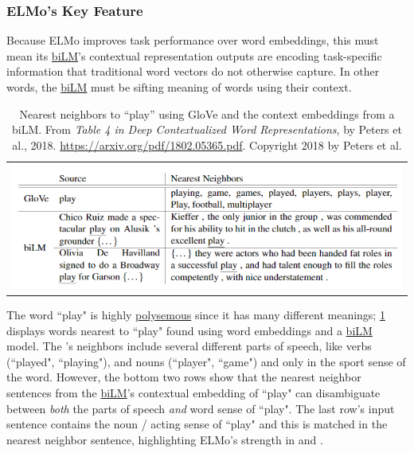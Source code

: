 \subsubsection{ELMo's Key Feature} \label{sec:ELMoKeyFeature}

Because ELMo improves task performance over word embeddings, this must mean its \hyperref[sec:BidirectionalLM]{biLM}'s contextual representation outputs are encoding task-specific information that traditional word vectors do not otherwise capture. In other words, the \hyperref[sec:BidirectionalLM]{biLM} must be sifting meaning of words using their context.   


\begin{table}[ht!]
  \centering
  \begin{tabular}{ c }
    
    \begin{minipage}{.8\textwidth}
      \includegraphics[width=\linewidth]{imgs/table_elmoPlay.png}
    \end{minipage}
    
  \end{tabular}
  \caption{\footnotesize Nearest neighbors to ``play” using GloVe and the context embeddings from a biLM. From \emph{Table 4 in Deep Contextualized Word Representations}, by Peters et al., 2018. \url{https://arxiv.org/pdf/1802.05365.pdf}. Copyright 2018 by Peters et al.}
  \label{tbl:elmoPlayExample}
\end{table}


The word ``play" is highly \hyperref[sec:PolysemyAgainInElmo]{polysemous} since it has many different meanings;  \cref{tbl:elmoPlayExample} displays words nearest to ``play" found using  word embeddings and a \hyperref[sec:BidirectionalLM]{biLM} model. The 's neighbors include several different parts of speech, like verbs (``played", ``playing"), and nouns (``player", ``game") and only in the sport sense of the word. However, the bottom two rows show that the nearest neighbor sentences from the \hyperref[sec:BidirectionalLM]{biLM}'s contextual embedding of ``play" can disambiguate between \emph{both} the parts of speech \emph{and} word sense of ``play". The last row's input sentence contains the noun / acting sense of ``play" and this is matched in the nearest neighbor sentence, highlighting ELMo's strength in  and . 
